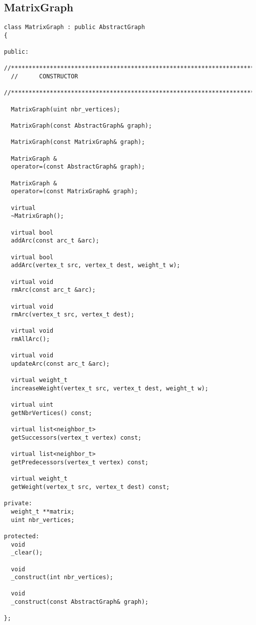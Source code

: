\subsection{MatrixGraph}

\begin{verbatim}
class MatrixGraph : public AbstractGraph
{

public:
  //************************************************************************************************
  //      CONSTRUCTOR
  //************************************************************************************************

  MatrixGraph(uint nbr_vertices);

  MatrixGraph(const AbstractGraph& graph);

  MatrixGraph(const MatrixGraph& graph);

  MatrixGraph &
  operator=(const AbstractGraph& graph);

  MatrixGraph &
  operator=(const MatrixGraph& graph);

  virtual
  ~MatrixGraph();

  virtual bool
  addArc(const arc_t &arc);

  virtual bool
  addArc(vertex_t src, vertex_t dest, weight_t w);

  virtual void
  rmArc(const arc_t &arc);

  virtual void
  rmArc(vertex_t src, vertex_t dest);

  virtual void
  rmAllArc();

  virtual void
  updateArc(const arc_t &arc);

  virtual weight_t
  increaseWeight(vertex_t src, vertex_t dest, weight_t w);

  virtual uint
  getNbrVertices() const;

  virtual list<neighbor_t>
  getSuccessors(vertex_t vertex) const;

  virtual list<neighbor_t>
  getPredecessors(vertex_t vertex) const;

  virtual weight_t
  getWeight(vertex_t src, vertex_t dest) const;

private:
  weight_t **matrix;
  uint nbr_vertices;

protected:
  void
  _clear();

  void
  _construct(int nbr_vertices);

  void
  _construct(const AbstractGraph& graph);

};
\end{verbatim}

